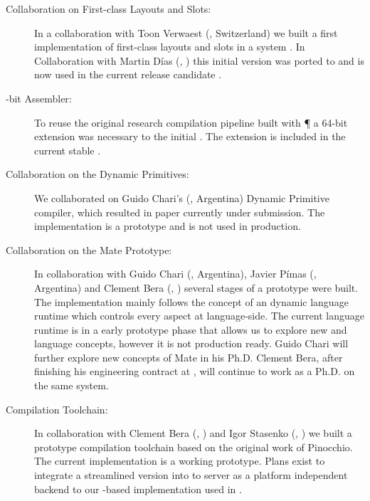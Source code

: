 \begin{description}
	\item[Collaboration on First-class Layouts and Slots:]
		In a collaboration with To\-on Verwaest (\SCG, Switzerland) we built a first implementation of first-class layouts and slots in a \ST system \cite{Verw11a}.
		In Collaboration with Martin Días (\RMoD, \INRIA) this initial version was ported to \PH and is now used in the current release candidate .

	\item[-bit Assembler:]
		To reuse the original research compilation pipeline built with \P \cite{Verw10a, Brun11a} a 64-bit extension was necessary to the initial .
		The extension is included in the current stable .

	\item[Collaboration on the \WF Dynamic Primitives:]
		We collaborated on Guido Chari's (\UBA, Argentina) \WF Dynamic Primitive compiler, which resulted in paper currently under submission\cite{Char13a}.
		The implementation is a prototype and is not used in production.

	\item[Collaboration on the Mate \VM Prototype:]
		In collaboration with Guido Cha\-ri (\UBA, Argentina), Javier Pímas (\UBA, Argentina) and Clement Bera (\RMoD, \INRIA) several stages of a prototype \VM were built.
		The implementation mainly follows the concept of an dynamic language runtime which controls every aspect at language-side.
		The current language runtime is in a early prototype phase that allows us to explore new \VM and language concepts, however it is not production ready.
		Guido Chari will further explore new concepts of Mate in his Ph.D.
		Clement Bera, after finishing his engineering contract at \RMoD, will continue to work as a Ph.D. on the same system.

	\item[\VirtualCPU Compilation Toolchain:]
		In collaboration with Clement Bera (\RMoD, \INRIA) and Igor Stasenko (\RMoD, \INRIA) we built a prototype compilation toolchain based on the original work of Pinocchio.
		The current implementation is a working prototype.
		Plans exist to integrate a streamlined version into \PH to server as a platform independent backend to our \B-based \FFI implementation used in \PH.


\end{description}
